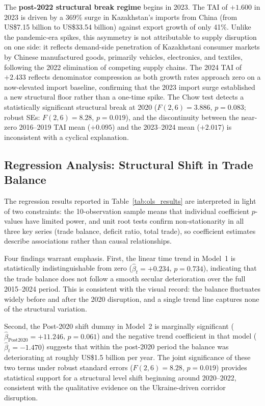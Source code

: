 \documentclass[12pt]{article}
\begin{document}
The \textbf{post-2022 structural break regime} begins in 2023. The TAI of $+1.600$ in 2023 is driven by a 369\% surge in Kazakhstan's imports from China (from US\$7.15 billion to US\$33.54 billion) against export growth of only 41\%. Unlike the pandemic-era spikes, this asymmetry is not attributable to supply disruption on one side: it reflects demand-side penetration of Kazakhstani consumer markets by Chinese manufactured goods, primarily vehicles, electronics, and textiles, following the 2022 elimination of competing supply chains. The 2024 TAI of $+2.433$ reflects denominator compression as both growth rates approach zero on a now-elevated import baseline, confirming that the 2023 import surge established a new structural floor rather than a one-time spike. The Chow test detects a statistically significant structural break at 2020 ($F(2,6) = 3.886$, $p = 0.083$; robust SEs: $F(2,6) = 8.28$, $p = 0.019$), and the discontinuity between the near-zero 2016--2019 TAI mean ($+0.095$) and the 2023--2024 mean ($+2.017$) is inconsistent with a cyclical explanation.

\subsection{Regression Analysis: Structural Shift in Trade Balance}

The regression results reported in Table~\ref{tab:ols_results} are interpreted in light of two constraints: the 10-observation sample means that individual coefficient $p$-values have limited power, and unit root tests confirm non-stationarity in all three key series (trade balance, deficit ratio, total trade), so coefficient estimates describe associations rather than causal relationships.

Four findings warrant emphasis. First, the linear time trend in Model~1 is statistically indistinguishable from zero ($\hat{\beta}_t = +0.234$, $p = 0.734$), indicating that the trade balance does not follow a smooth secular deterioration over the full 2015--2024 period. This is consistent with the visual record: the balance fluctuates widely before and after the 2020 disruption, and a single trend line captures none of the structural variation.

Second, the Post-2020 shift dummy in Model~2 is marginally significant ($\hat{\beta}_{\text{Post2020}} = +11.246$, $p = 0.061$) and the negative trend coefficient in that model ($\hat{\beta}_t = -1.470$) suggests that within the post-2020 period the balance was deteriorating at roughly US\$1.5 billion per year. The joint significance of these two terms under robust standard errors ($F(2,6) = 8.28$, $p = 0.019$) provides statistical support for a structural level shift beginning around 2020--2022, consistent with the qualitative evidence on the Ukraine-driven corridor disruption.
\end{document}
